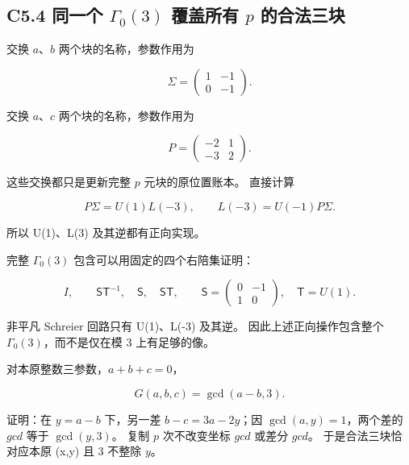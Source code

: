 \subsection*{\texorpdfstring{{C5.4} {同一个} {\ensuremath{\Gamma _{0}(3)}} {覆盖所有} {\ensuremath{p}} {的合法三块}}{C5.4 同一个  覆盖所有  的合法三块}}\label{C5-h31}

{交换} {\ensuremath{a}、\ensuremath{b}} {两个块的名称，参数作用为}

\[
\Sigma=\begin{pmatrix}1&-1\\0&-1\end{pmatrix}.
\]

{交换} {\ensuremath{a}、\ensuremath{c}} {两个块的名称，参数作用为}

\[
P=\begin{pmatrix}-2&1\\-3&2\end{pmatrix}.
\]

{这些交换都只是更新完整} {\ensuremath{p}} {元块的原位置账本。} {直接计算}

\[
P\Sigma=U(1)L(-3),\qquad
\boxed{L(-3)=U(-1)P\Sigma.}
\tag{C5.4}
\]

{所以} {U(1)、L(3)} {及其逆都有正向实现。}

{完整} {\ensuremath{\Gamma _{0}(3)}} {包含可以用固定的四个右陪集证明：}

\[
I,\qquad \mathsf S\mathsf T^{-1},\quad\mathsf S,
\quad\mathsf S\mathsf T,
\qquad
\mathsf S=\begin{pmatrix}0&-1\\1&0\end{pmatrix},\quad\mathsf T=U(1).
\]

{非平凡} {Schreier} {回路只有} {U(1)、L(-3)} {及其逆。} {因此上述正向操作包含整个} {\ensuremath{\Gamma _{0}(3)}，而不是仅在模} {3} {上有足够的像。}

{对本原整数三参数，\ensuremath{a+b+c=0}，}

\[
G(a,b,c)=\gcd(a-b,3).
\]

{证明：在} {\ensuremath{y=a-b}} {下，另一差} {\ensuremath{b-c=3a-2y}；因} {\ensuremath{\operatorname{gcd}(a,y)=1}，两个差的} {\ensuremath{gcd}} {等于} {\ensuremath{\operatorname{gcd}(y,3)}。} {复制} {\ensuremath{p}} {次不改变坐标} {\ensuremath{gcd}} {或差分} {\ensuremath{gcd}。} {于是合法三块恰对应本原} {(x,y)} {且} {3} {不整除} {\ensuremath{y}。}

